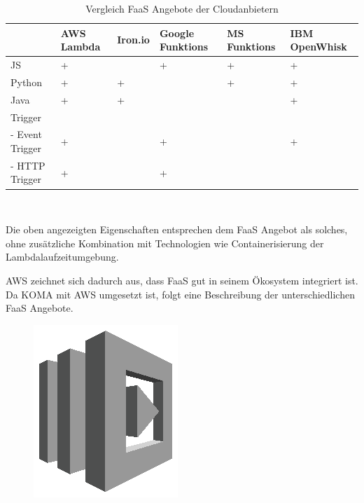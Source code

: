 \documentclass[
12pt,
english,
ngerman,
headsepline,
twoside,
openright,
numbers=noenddot,version=first
]{scrreprt}
\begin{document}
\begin{table}[H]
	\centering{}
	\label{comparison-FaaS}
	\begin{tabular}{ p{7em} | p{2cm} | p{2cm} | p{2cm} | p{2cm} | p{2cm} }
		& AWS Lambda & Iron.io & Google Funktions & MS Funktions & IBM OpenWhisk  \\
		\hline
		JS & + &  & + & + & + \\
		\hline
		Python & + & + &  & + & + \\
		\hline
		Java & + & + &  &  & + \\
		\hline
		Trigger &  &  &  &  &  \\
		\hline
		- Event Trigger  & + &  & + &  & + \\
		\hline
		- HTTP Trigger & + &  & + &  &  \\
	\end{tabular}
\\
\caption{Vergleich \acrshort{FaaS} Angebote der Cloudanbietern}
\end{table}
Die oben angezeigten Eigenschaften entsprechen dem \acrshort{FaaS} Angebot als solches, ohne zusätzliche Kombination mit Technologien wie Containerisierung der Lambdalaufzeitumgebung.

\acrshort{AWS} zeichnet sich dadurch aus, dass \acrshort{FaaS} gut in seinem Ökosystem integriert ist. Da \acrshort{KOMA} mit \acrshort{AWS} umgesetzt ist, folgt eine Beschreibung der unterschiedlichen \acrshort{FaaS} Angebote.


\begin{figure}
	\includegraphics[width=0.9\linewidth]{./pics/aws/Compute_GRAYSCALE_AWSLambda.eps}
\end{figure}
\end{document}
